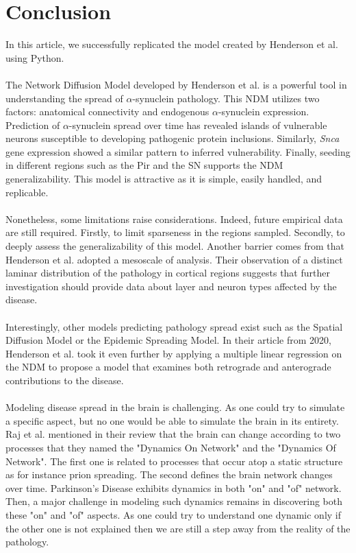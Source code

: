 \section{Conclusion}
In this article, we successfully replicated the model created by Henderson et al. using Python.\\
\\
The Network Diffusion Model developed by Henderson et al. is a powerful tool in understanding the spread of $\alpha$-synuclein pathology. This NDM utilizes two factors: anatomical connectivity and endogenous $\alpha$-synuclein expression. Prediction of $\alpha$-synuclein spread over time has revealed islands of vulnerable neurons susceptible to developing pathogenic protein inclusions. Similarly, \textit{Snca} gene expression showed a similar pattern to inferred vulnerability. Finally, seeding in different regions such as the Pir and the SN supports the NDM generalizability. This model is attractive as it is simple, easily handled, and replicable.\\
\\
Nonetheless, some limitations raise considerations. Indeed, future empirical data are still required. Firstly, to limit sparseness in the regions sampled. Secondly, to deeply assess the generalizability of this model. Another barrier comes from that Henderson et al. adopted a mesoscale of analysis. Their observation of a distinct laminar distribution of the pathology in cortical regions suggests that further investigation should provide data about layer and neuron types affected by the disease.\\
\\
Interestingly, other models predicting pathology spread exist such as the Spatial Diffusion Model \cite{Mezias_2020} or the Epidemic Spreading Model. \cite{Vogel_2020} In their article from 2020, Henderson et al. took it even further by applying a multiple linear regression on the NDM to propose a model that examines both retrograde and anterograde contributions to the disease. \cite{Henderson_2020_tau}\\
\\
Modeling disease spread in the brain is challenging. As one could try to simulate a specific aspect, but no one would be able to simulate the brain in its entirety. Raj et al. mentioned in their review that the brain can change according to two processes that they named the "Dynamics On Network" and the "Dynamics Of Network". The first one is related to processes that occur atop a static structure as for instance prion spreading. The second defines the brain network changes over time. Parkinson's Disease exhibits dynamics in both "on" and "of" network. \cite{Raj_2018} Then, a major challenge in modeling such dynamics remains in discovering both these "on" and "of" aspects. As one could try to understand one dynamic only if the other one is not explained then we are still a step away from the reality of the pathology. 
